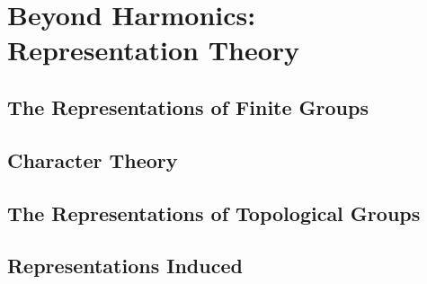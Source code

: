 \chapter[Beyond Harmonics: Representation Theory]{Beyond Harmonics:\\ Representation Theory}

\section{The Representations of Finite Groups} %
\label{sec:the_representations_of_finite_groups}


\section{Character Theory} %
\label{sec:character_theory}


\section{The Representations of Topological Groups} %
\label{sec:the_representations_of_topological_groups}


\section{Representations Induced} %
\label{sec:representations_induced}

